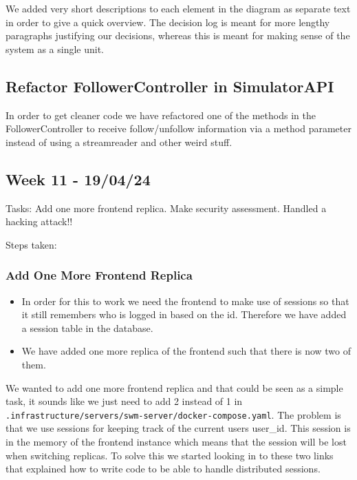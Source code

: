 We added very short descriptions to each element in the diagram as separate text in order to give a quick overview. The decision log is meant for more lengthy paragraphs justifying our decisions, whereas this is meant for making sense of the system as a single unit.

\subsection{Refactor FollowerController in SimulatorAPI}
\label{log:refactor-followercontroller-in-simulatorapi}

In order to get cleaner code we have refactored one of the methods in the FollowerController to receive follow/unfollow information via a method parameter instead of using a streamreader and other weird stuff.

\subsection{Week 11 - 19/04/24}
\label{log:week11}

Tasks: Add one more frontend replica. Make security assessment. Handled
a hacking attack!!

Steps taken:

\subsubsection{Add One More Frontend Replica}
\label{log:add-one-more-frontend-replica}

\begin{itemize}
    \item In order for this to work we need the frontend to make use of sessions so that it still remembers who is logged in based on the id. Therefore we have added a session table in the database.
    \item We have added one more replica of the frontend such that there is now two of them.
\end{itemize}

We wanted to add one more frontend replica and that could be seen as a simple task, it sounds like we just need to add 2 instead of 1 in \texttt{.infrastructure/servers/swm-server/docker-compose.yaml}. The problem is that we use sessions for keeping track of the current users user\_id. This session is in the memory of the frontend instance which means that the session will be lost when switching replicas. To solve this we started looking in to these two links that explained how to write code to be able to handle distributed sessions.

